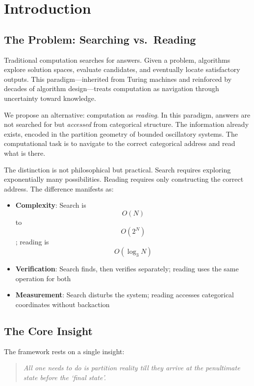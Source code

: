 \documentclass[11pt,twocolumn,a4paper]{article}
\theoremstyle{definition}
\theoremstyle{remark}
\begin{document}
\section{Introduction}
\label{sec:introduction}

\subsection{The Problem: Searching vs.\ Reading}

Traditional computation searches for answers. Given a problem, algorithms explore solution spaces, evaluate candidates, and eventually locate satisfactory outputs. This paradigm---inherited from Turing machines and reinforced by decades of algorithm design---treats computation as navigation through uncertainty toward knowledge.

We propose an alternative: computation as \emph{reading}. In this paradigm, answers are not searched for but \emph{accessed} from categorical structure. The information already exists, encoded in the partition geometry of bounded oscillatory systems. The computational task is to navigate to the correct categorical address and read what is there.

The distinction is not philosophical but practical. Search requires exploring exponentially many possibilities. Reading requires only constructing the correct address. The difference manifests as:
\begin{itemize}
    \item \textbf{Complexity}: Search is $$O(N)$$ to $$O(2^N)$$; reading is $$O(\log_3 N)$$
    \item \textbf{Verification}: Search finds, then verifies separately; reading uses the same operation for both
    \item \textbf{Measurement}: Search disturbs the system; reading accesses categorical coordinates without backaction
\end{itemize}

\subsection{The Core Insight}

The framework rests on a single insight:
\begin{quote}
\emph{All one needs to do is partition reality till they arrive at the penultimate state before the `final state'.}
\end{quote}
\end{document}
